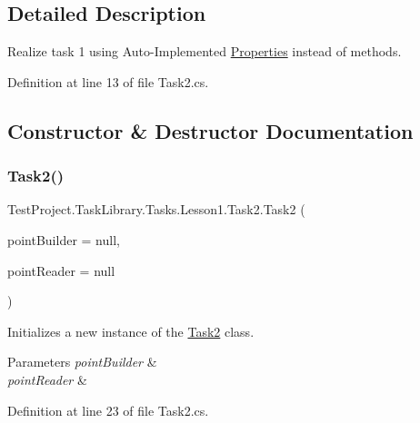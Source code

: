 \subsection{Detailed Description}
Realize task 1 using Auto-\/\+Implemented \mbox{\hyperlink{namespace_test_project_1_1_task_library_1_1_properties}{Properties}} instead of methods. 



Definition at line 13 of file Task2.\+cs.



\subsection{Constructor \& Destructor Documentation}
\mbox{\label{class_test_project_1_1_task_library_1_1_tasks_1_1_lesson1_1_1_task2_a030b8c932ff7ce65221fe4e088725c57}} 
\subsubsection{\texorpdfstring{Task2()}{Task2()}}
{\footnotesize\ttfamily Test\+Project.\+Task\+Library.\+Tasks.\+Lesson1.\+Task2.\+Task2 (\begin{DoxyParamCaption}\item[{I\+Builder$<$ \mbox{\hyperlink{class_test_project_1_1_task_library_1_1_tasks_1_1_lesson1_1_1_models_1_1_point}{Point}} $>$}]{point\+Builder = {\ttfamily null},  }\item[{I\+Reader}]{point\+Reader = {\ttfamily null} }\end{DoxyParamCaption})}



Initializes a new instance of the \mbox{\hyperlink{class_test_project_1_1_task_library_1_1_tasks_1_1_lesson1_1_1_task2}{Task2}} class. 


\begin{DoxyParams}{Parameters}
{\em point\+Builder} & \\
\hline
{\em point\+Reader} & \\
\hline
\end{DoxyParams}


Definition at line 23 of file Task2.\+cs.



